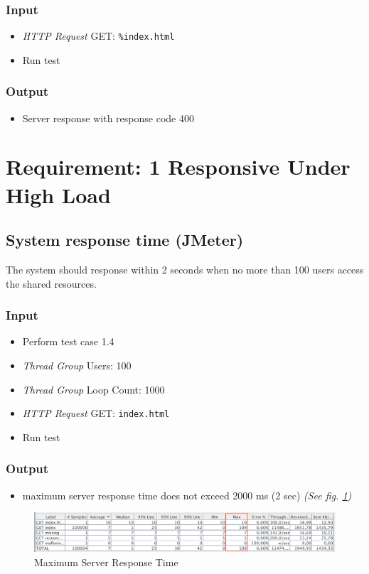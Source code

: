 \documentclass[a4paper, 12pt]{article}
\begin{document}
\subsubsection{Input}
\begin{itemize}
\item \textit{HTTP Request} GET: \texttt{\%index.html}
\item Run test
\end{itemize}

\subsubsection{Output}
\begin{itemize}
\item Server response with response code 400
\end{itemize}

\newpage
\section{Requirement: 1 Responsive Under High Load}

\subsection{System response time (JMeter)}

The system should response within 2 seconds when no more than 100 users access the shared resources.

\subsubsection{Input}
\begin{itemize}
\item Perform test case 1.4
\item \textit{Thread Group} Users: 100
\item \textit{Thread Group} Loop Count: 1000
\item \textit{HTTP Request} GET: \texttt{index.html}
\item Run test
\end{itemize}

\subsubsection{Output}
\begin{itemize}
\item maximum server response time does not exceed 2000 ms (2 sec) \textit{(See fig. \ref{TC4.1})}
\end{itemize}

\begin{figure}[H]
\includegraphics[scale=0.5]{output_clarification/HighLoad.png} 
\caption{Maximum Server Response Time}
\label{TC4.1}
\end{figure}
\end{document}
